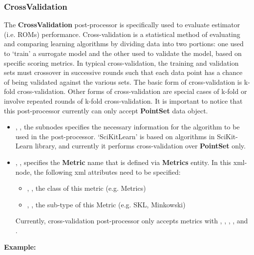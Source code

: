 \subsubsection{CrossValidation}
\label{CVPP}
The \textbf{CrossValidation} post-processor is specifically used to evaluate estimator (i.e. ROMs) performance.
Cross-validation is a statistical method of evaluating and comparing learning algorithms by dividing data into
two portions: one used to `train' a surrogate model and the other used to validate the model, based on specific
scoring metrics. In typical cross-validation, the training and validation sets must crossover in successive
rounds such that each data point has a chance of being validated against the various sets. The basic form of
cross-validation is k-fold cross-validation. Other forms of cross-validation are special cases of k-fold or involve
repeated rounds of k-fold cross-validation. \nb It is important to notice that this post-processor currently can
only accept \textbf{PointSet} data object.
%
%
\begin{itemize}
  \item {}, , the subnodes specifies the necessary information
    for the algorithm to be used in the post-processor. `SciKitLearn' is based on algorithms in SciKit-Learn
    library, and currently it performs cross-validation over \textbf{PointSet} only.
  \item {}, , specifies the \textbf{Metric} name that is defined via
    \textbf{Metrics} entity. In this xml-node, the following xml attributes need to be specified:
    \begin{itemize}
      \item {}, , the class of this metric (e.g. Metrics)
      \item {}, , the sub-type of this Metric (e.g. SKL, Minkowski)
    \end{itemize}
    \nb Currently, cross-validation post-processor only accepts  metrics with 
    , , ,
    , and .
\end{itemize}

\textbf{Example:}

